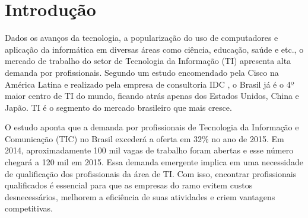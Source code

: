

\begin{center}

\end{center}
\chapter{Introdução}

\label{chap:introduction}

Dados os avanços da tecnologia, a popularização do uso de computadores e aplicação da informática em diversas áreas como ciência, educação, saúde e etc., o mercado de trabalho do setor de Tecnologia da Informação (TI) apresenta alta demanda por profissionais. Segundo um estudo encomendado pela Cisco na América Latina e realizado pela empresa de consultoria IDC \cite{cisco:13}, o Brasil já é o 4º maior centro de TI do mundo, ficando atrás apenas dos Estados Unidos, China e Japão. TI é o segmento do mercado brasileiro que mais cresce. 


O estudo aponta que a demanda por profissionais de Tecnologia da Informação e Comunicação (TIC) no Brasil excederá a oferta em 32\% no ano de 2015. Em 2014, aproximadamente 100 mil vagas de trabalho foram abertas e esse número chegará a 120 mil em 2015. Essa demanda emergente implica em uma necessidade de qualificação dos profissionais da área de TI. Com isso, encontrar profissionais qualificados é essencial para que as empresas do ramo evitem custos desnecessários, melhorem a eficiência de suas atividades e criem vantagens competitivas.

 

